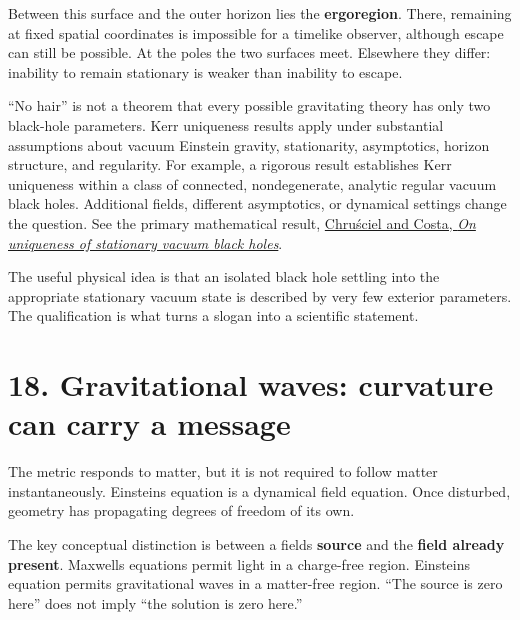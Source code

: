 \documentclass[
  11pt,
  letterpaper,
  oneside,
  openany]{scrbook}
\begin{document}
\begin{center}
\begingroup
{}
\ifdim\wd\grmathbox>\linewidth
\resizebox{\linewidth}{!}{\usebox{\grmathbox}}
\else\usebox{\grmathbox}\fi
\endgroup
\end{center}

Between this surface and the outer horizon lies the \textbf{ergoregion}.
There, remaining at fixed spatial coordinates is impossible for a
timelike observer, although escape can still be possible. At the poles
the two surfaces meet. Elsewhere they differ: inability to remain
stationary is weaker than inability to escape.

``No hair'' is not a theorem that every possible gravitating theory has
only two black-hole parameters. Kerr uniqueness results apply under
substantial assumptions about vacuum Einstein gravity, stationarity,
asymptotics, horizon structure, and regularity. For example, a rigorous
result establishes Kerr uniqueness within a class of connected,
nondegenerate, analytic regular vacuum black holes. Additional fields,
different asymptotics, or dynamical settings change the question. See
the primary mathematical result,
\href{https://arxiv.org/abs/0806.0016}{Chruściel and Costa, \emph{On
uniqueness of stationary vacuum black holes}}.

The useful physical idea is that an isolated black hole settling into
the appropriate stationary vacuum state is described by very few
exterior parameters. The qualification is what turns a slogan into a
scientific statement.

\hypertarget{chapter-18}{%
\chapter{18. Gravitational waves: curvature can carry a
message}\label{chapter-18}}

The metric responds to matter, but it is not required to follow matter
instantaneously. Einstein\textquotesingle s equation is a dynamical
field equation. Once disturbed, geometry has propagating degrees of
freedom of its own.

The key conceptual distinction is between a field\textquotesingle s
\textbf{source} and the \textbf{field already present}.
Maxwell\textquotesingle s equations permit light in a charge-free
region. Einstein\textquotesingle s equation permits gravitational waves
in a matter-free region. ``The source is zero here'' does not imply
``the solution is zero here.''
\end{document}
